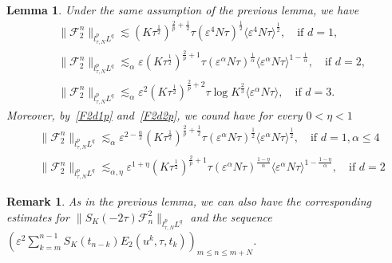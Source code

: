 \documentclass[10pt,a4paper]{article}
\newtheorem{lemma}[theorem]{Lemma}
\newtheorem{remark}[theorem]{Remark}
\begin{document}
  \begin{lemma}\label{F2} %
    Under the same assumption of the previous lemma, we have 
    \begin{align}
      &\label{F2d1p} \| \mathcal F_2^n \|_{l^p_{\tau,N}L^q} \lesssim (K\tau^\frac12)^{\frac2p+\frac12} \tau 
      {(\varepsilon^4 N\tau)}^\frac12 {\langle\varepsilon^4 N\tau\rangle}^\frac12 ,\quad \text{if }d=1, \\
      &\label{F2d2p} \| \mathcal F_2^n \|_{l^p_{\tau,N}L^q} \lesssim_\alpha \varepsilon (K\tau^\frac12)^{\frac2p+1} \tau 
      {(\varepsilon^\alpha N\tau)}^\frac1\alpha {\langle\varepsilon^\alpha N\tau\rangle}^{1-\frac1\alpha} ,\quad \text{if }d=2, \\
      &\label{F2d3} \| \mathcal F_2^n \|_{l^p_{\tau,N}L^q} \lesssim_\alpha \varepsilon^2 (K\tau^\frac12)^{\frac2p+2} \tau \log{K}^\frac23
      \langle\varepsilon^\alpha N\tau\rangle ,\quad \text{if }d=3.
    \end{align}
    Moreover, by~\eqref{F2d1p} and~\eqref{F2d2p}, we cound have for every \( 0 <
    \eta < 1\)
    \begin{align}
      &\label{F2d1} \| \mathcal F_2^n \|_{l^p_{\tau,N}L^q} \lesssim_\alpha \varepsilon^{2-\frac\alpha2} (K\tau^\frac12)^{\frac2p+\frac12} \tau 
      {(\varepsilon^\alpha N\tau)}^\frac12 {\langle\varepsilon^\alpha N\tau\rangle}^\frac12 ,\quad \text{if }d=1,\alpha \leq 4 \\
      &\label{F2d2} \| \mathcal F_2^n \|_{l^p_{\tau,N}L^q} \lesssim_{\alpha,\eta} \varepsilon^{1+\eta} (K\tau^\frac12)^{\frac2p+1} \tau 
      {(\varepsilon^\alpha N\tau)}^\frac{1-\eta}\alpha {\langle\varepsilon^\alpha N\tau\rangle}^{1-\frac{1-\eta}\alpha} ,\quad \text{if }d=2
    \end{align}
  \end{lemma}

  \begin{remark}\label{remF2}
    As in the previous lemma, we can also have the corresponding estimates for
    \( \|S_K(-2\tau)\mathcal F^2_n\|_{l^p_{\tau,N}L^q} \) and the sequence 
    \( (\varepsilon^2 \sum_{k=m}^{n-1} S_K(t_{n-k}) E_2(u^k, \tau, t_k))_{m \leq n \leq m+N} \).
  \end{remark}
\end{document}
